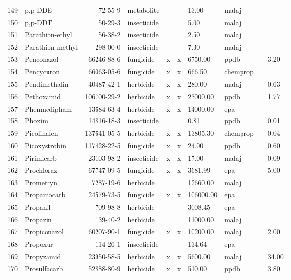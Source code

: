 \begin{longtable}{lp{3cm}rlp{0.5cm}p{0.5cm}p{1cm}p{1cm}p{1cm}p{1cm}}
  149 & p,p-DDE & 72-55-9 & metabolite &  &  & 13.00 & malaj &  &  \\ 
  150 & p,p-DDT & 50-29-3 & insecticide &  &  & 5.00 & malaj &  &  \\ 
  151 & Parathion-ethyl & 56-38-2 & insecticide &  &  & 2.50 & malaj &  &  \\ 
  152 & Parathion-methyl & 298-00-0 & insecticide &  &  & 7.30 & malaj &  &  \\ 
  153 & Penconazol & 66246-88-6 & fungicide & x & x & 6750.00 & ppdb &  & 3.20 \\ 
  154 & Pencycuron & 66063-05-6 & fungicide & x & x & 666.50 & chemprop &  &  \\ 
  155 & Pendimethalin & 40487-42-1 & herbicide & x & x & 280.00 & malaj &  & 0.63 \\ 
  156 & Pethoxamid & 106700-29-2 & herbicide & x & x & 23000.00 & ppdb &  & 1.77 \\ 
  157 & Phenmedipham & 13684-63-4 & herbicide & x & x & 14000.00 & epa &  &  \\ 
  158 & Phoxim & 14816-18-3 & insecticide &  &  & 0.81 & ppdb &  & 0.01 \\ 
  159 & Picolinafen & 137641-05-5 & herbicide & x & x & 13805.30 & chemprop &  & 0.04 \\ 
  160 & Picoxystrobin & 117428-22-5 & fungicide & x & x & 24.00 & ppdb &  & 0.60 \\ 
  161 & Pirimicarb & 23103-98-2 & insecticide & x & x & 17.00 & malaj &  & 0.09 \\ 
  162 & Prochloraz & 67747-09-5 & fungicide & x & x & 3681.99 & epa &  & 5.00 \\ 
  163 & Prometryn & 7287-19-6 & herbicide &  &  & 12660.00 & malaj &  &  \\ 
  164 & Propamocarb & 24579-73-5 & fungicide & x & x & 106000.00 & epa &  &  \\ 
  165 & Propanil & 709-98-8 & herbicide &  &  & 3008.45 & epa &  &  \\ 
  166 & Propazin & 139-40-2 & herbicide &  &  & 11000.00 & malaj &  &  \\ 
  167 & Propiconazol & 60207-90-1 & fungicide & x & x & 10200.00 & malaj &  & 2.00 \\ 
  168 & Propoxur & 114-26-1 & insecticide &  &  & 134.64 & epa &  &  \\ 
  169 & Propyzamid & 23950-58-5 & herbicide & x & x & 5600.00 & malaj &  & 34.00 \\ 
  170 & Prosulfocarb & 52888-80-9 & herbicide & x & x & 510.00 & ppdb &  & 3.80 \\ 

\end{longtable}
